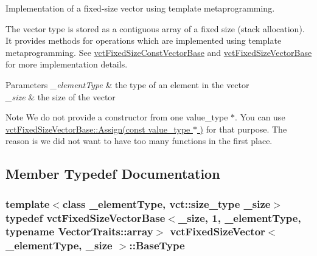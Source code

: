 Implementation of a fixed-\/size vector using template metaprogramming. 

The vector type is stored as a contiguous array of a fixed size (stack allocation). It provides methods for operations which are implemented using template metaprogramming. See \hyperlink{classvct_fixed_size_const_vector_base}{vct\+Fixed\+Size\+Const\+Vector\+Base} and \hyperlink{classvct_fixed_size_vector_base}{vct\+Fixed\+Size\+Vector\+Base} for more implementation details.


\begin{DoxyParams}{Parameters}
{\em \+\_\+element\+Type} & the type of an element in the vector \\
\hline
{\em \+\_\+size} & the size of the vector\\
\hline
\end{DoxyParams}
\begin{DoxyNote}{Note}
We do not provide a constructor from one {\ttfamily value\+\_\+type $\ast$}. You can use \hyperlink{classvct_fixed_size_vector_base_a38d50afd2b6bc08c82a9aac3ecba8a3d}{vct\+Fixed\+Size\+Vector\+Base\+::\+Assign(const value\+\_\+type $\ast$ )} for that purpose. The reason is we did not want to have too many functions in the first place. 
\end{DoxyNote}


\subsection{Member Typedef Documentation}
\hypertarget{classvct_fixed_size_vector_a04088d3a17a06af2d59f3bd99c42fb75}{}
\subsubsection[{Base\+Type}]{\setlength{\rightskip}{0pt plus 5cm}template$<$class \+\_\+element\+Type, vct\+::size\+\_\+type \+\_\+size$>$ typedef {\bf vct\+Fixed\+Size\+Vector\+Base}$<$\+\_\+size, 1, \+\_\+element\+Type, typename {\bf Vector\+Traits\+::array}$>$ {\bf vct\+Fixed\+Size\+Vector}$<$ \+\_\+element\+Type, \+\_\+size $>$\+::{\bf Base\+Type}}\label{classvct_fixed_size_vector_a04088d3a17a06af2d59f3bd99c42fb75}
\hypertarget{classvct_fixed_size_vector_afcfc466ed71975aef98c2789fd3e4dcf}{}
